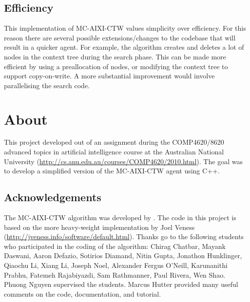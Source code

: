 \documentclass[a4paper,11pt]{article}
\begin{document}
\subsection{Efficiency}
This implementation of MC-AIXI-CTW values simplicity over efficiency. For this reason there are several possible extensions/changes to the codebase that will result in a quicker agent. For example, the algorithm creates and deletes a lot of nodes in the context tree during the search phase. This can be made more efficient by using a preallocation of nodes, or modifying the context tree to support copy-on-write. A more substantial improvement would involve parallelising the search code.


\section{About}
This project developed out of an assignment during the COMP4620/8620 advanced topics in artificial intelligence course at the Australian National University (\url{http://cs.anu.edu.au/courses/COMP4620/2010.html}). The goal was to develop a simplified version of the MC-AIXI-CTW agent using C++.

\subsection{Acknowledgements}
The MC-AIXI-CTW algorithm was developed by \cite{Hutter:11aixictwx}. The code in this project is based on the more heavy-weight implementation by Joel Veness (\url{http://jveness.info/software/default.html}). Thanks go to the following students who participated in the coding of the algorithm: Chirag Chatbar, Mayank Daswani, Aaron Defazio, Sotirios Diamand, Nitin Gupta, Jonathon Hunklinger, Qiaochu Li, Xiang Li, Joseph Noel, Alexander Fergus O'Neill, Karunanithi Prabhu, Fatemeh Rajabiyazdi, Sam Rathmanner, Paul Rivera, Wen Shao. Phuong Nguyen supervised the students. Marcus Hutter provided many useful comments on the code, documentation, and tutorial. 



\newpage


\end{document}
